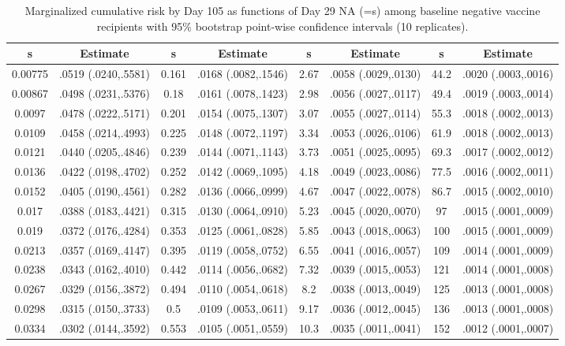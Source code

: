 \begin{longtable}{cccccccc}
\caption{Marginalized cumulative risk by Day 105 as functions of Day 29 NA (=s) among baseline negative vaccine recipients with 95\% bootstrap point-wise confidence intervals (10 replicates).} \\ 
   \hline  s& Estimate& s& Estimate& s& Estimate& s& Estimate\\ 
\hline
0.00775 & .0519 (.0240,.5581) & 0.161 & .0168 (.0082,.1546) & 2.67 & .0058 (.0029,.0130) & 44.2 & .0020 (.0003,.0016) \\ 
  0.00867 & .0498 (.0231,.5376) & 0.18 & .0161 (.0078,.1423) & 2.98 & .0056 (.0027,.0117) & 49.4 & .0019 (.0003,.0014) \\ 
  0.0097 & .0478 (.0222,.5171) & 0.201 & .0154 (.0075,.1307) & 3.07 & .0055 (.0027,.0114) & 55.3 & .0018 (.0002,.0013) \\ 
  0.0109 & .0458 (.0214,.4993) & 0.225 & .0148 (.0072,.1197) & 3.34 & .0053 (.0026,.0106) & 61.9 & .0018 (.0002,.0013) \\ 
  0.0121 & .0440 (.0205,.4846) & 0.239 & .0144 (.0071,.1143) & 3.73 & .0051 (.0025,.0095) & 69.3 & .0017 (.0002,.0012) \\ 
  0.0136 & .0422 (.0198,.4702) & 0.252 & .0142 (.0069,.1095) & 4.18 & .0049 (.0023,.0086) & 77.5 & .0016 (.0002,.0011) \\ 
  0.0152 & .0405 (.0190,.4561) & 0.282 & .0136 (.0066,.0999) & 4.67 & .0047 (.0022,.0078) & 86.7 & .0015 (.0002,.0010) \\ 
  0.017 & .0388 (.0183,.4421) & 0.315 & .0130 (.0064,.0910) & 5.23 & .0045 (.0020,.0070) & 97 & .0015 (.0001,.0009) \\ 
  0.019 & .0372 (.0176,.4284) & 0.353 & .0125 (.0061,.0828) & 5.85 & .0043 (.0018,.0063) & 100 & .0015 (.0001,.0009) \\ 
  0.0213 & .0357 (.0169,.4147) & 0.395 & .0119 (.0058,.0752) & 6.55 & .0041 (.0016,.0057) & 109 & .0014 (.0001,.0009) \\ 
  0.0238 & .0343 (.0162,.4010) & 0.442 & .0114 (.0056,.0682) & 7.32 & .0039 (.0015,.0053) & 121 & .0014 (.0001,.0008) \\ 
  0.0267 & .0329 (.0156,.3872) & 0.494 & .0110 (.0054,.0618) & 8.2 & .0038 (.0013,.0049) & 125 & .0013 (.0001,.0008) \\ 
  0.0298 & .0315 (.0150,.3733) & 0.5 & .0109 (.0053,.0611) & 9.17 & .0036 (.0012,.0045) & 136 & .0013 (.0001,.0008) \\ 
  0.0334 & .0302 (.0144,.3592) & 0.553 & .0105 (.0051,.0559) & 10.3 & .0035 (.0011,.0041) & 152 & .0012 (.0001,.0007) \\ 

\end{longtable}

